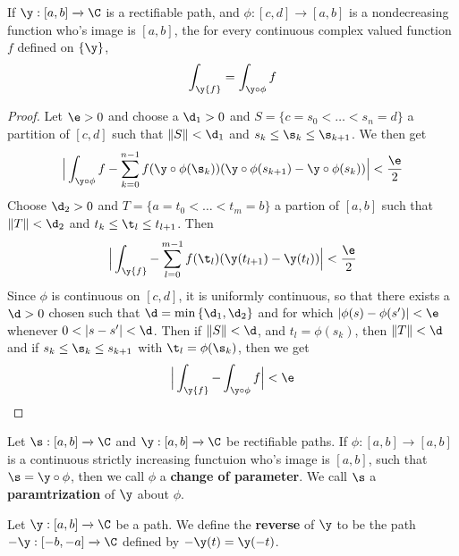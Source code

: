 \begin{theorem}\label{4.2.2}
    If $\y:[a,b] \xrightarrow{} \C$ is a rectifiable path, and $\phi:[c,d]
    \xrightarrow{} [a,b]$ is a nondecreasing function who's image is $[a,b]$,
    the for every continuous complex valued function $f$ defined on  $\{\y\}$,
    \begin{equation*}
        \int_\y{f}=\int_{\y \circ \phi}{f}
    \end{equation*}
\end{theorem}
\begin{proof}
    Let $\e>0$ and choose a  $\d_1>0$ and $S=\{c=s_0<\dots<s_n=d\}$ a
    partition of $[c,d]$ such that $\|S\|<\d_1$ and $s_k \leq \s_k \leq
    \s_{k+1}$. We then get
    \begin{equation*}
        \Big{|} \int_{\y \circ \phi}{f}-
        \sum_{k=0}^{n-1}{f(\y \circ \phi(\s_k))
            (\y \circ \phi(s_{k+1})-\y \circ \phi(s_k))} \Big{|}<\frac{\e}{2}
    \end{equation*}
    Choose $\d_2>0$ and $T=\{a=t_0<\dots<t_m=b\}$ a partion of $[a,b]$ such that
    $\|T\|<\d_2$ and $t_k \leq \t_l \leq t_{l+1}$. Then
    \begin{equation*}
        \Big{|} \int_\y{f}-\sum_{l=0}^{m-1}{f(\t_l)(\y(t_{l+1})-\y(t_l))} \Big{|}
        < \frac{\e}{2}
    \end{equation*}
    Since $\phi$ is continuous on $[c,d]$, it is uniformly continuous, so that
    there exists a $\d>0$ chosen such that $\d=\min{\{\d_1,\d_2\}}$ and for
    which $|\phi(s)-\phi(s')|<\e$ whenever $0<|s-s'|<\d$. Then if $\|S\|<\d$,
    and  $t_l=\phi(s_k)$, then $\|T\|<\d$ and if $s_k \leq \s_k \leq s_{k+1}$
    with $\t_l=\phi(\s_k)$, then we get
    \begin{equation*}
        \Big{|} \int_\y{f}-\int_{\y \circ \phi}{f} \Big{|}<\e
    \end{equation*}
\end{proof}

\begin{definition}
    Let $\s:[a,b] \xrightarrow{} \C$ and $\y:[a,b] \xrightarrow{} \C$ be
    rectifiable paths. If $\phi:[a,b] \xrightarrow{} [a,b]$ is a continuous
    strictly increasing functuion who's image is $[a,b]$, such that $\s=\y \circ
    \phi$, then we call  $\phi$ a \textbf{change of parameter}. We call $\s$ a
     \textbf{paramtrization} of $\y$ about  $\phi$.
\end{definition}

\begin{definition}
    Let $\y:[a,b] \xrightarrow{} \C$ be a path. We define the \textbf{reverse}
    of $\y$ to be the path $-\y:[-b,-a] \xrightarrow{} \C$ defined by
    $-\y(t)=\y(-t)$.
\end{definition}

